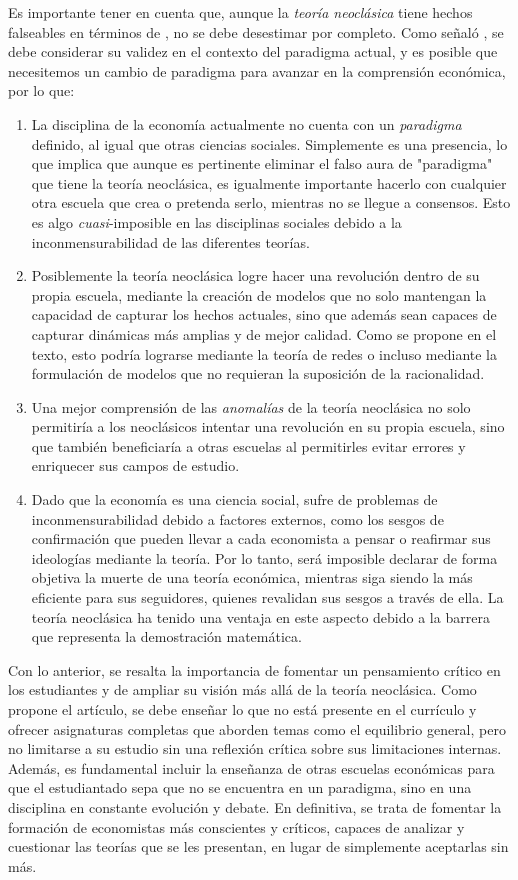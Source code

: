 \documentclass[12pt]{article}
\begin{document}
\begin{flushleft}
    Es importante tener en cuenta que, aunque la \textit{teoría neoclásica} tiene hechos falseables en términos de \citet{popper_1959}, no se debe desestimar por completo. Como señaló \citet{kuhn_1971}, se debe considerar su validez en el contexto del paradigma actual, y es posible que necesitemos un cambio de paradigma para avanzar en la comprensión económica, por lo que:
    \begin{enumerate}
        \item La disciplina de la economía actualmente no cuenta con un \textit{paradigma} definido, al igual que otras ciencias sociales. Simplemente es una presencia, lo que implica que aunque es pertinente eliminar el falso aura de "paradigma" que tiene la teoría neoclásica, es igualmente importante hacerlo con cualquier otra escuela que crea o pretenda serlo, mientras no se llegue a consensos. Esto es algo \textit{cuasi}-imposible en las disciplinas sociales debido a la inconmensurabilidad de las diferentes teorías.
        \item Posiblemente la teoría neoclásica logre hacer una revolución dentro de su propia escuela, mediante la creación de modelos que no solo mantengan la capacidad de capturar los hechos actuales, sino que además sean capaces de capturar dinámicas más amplias y de mejor calidad. Como se propone en el texto, esto podría lograrse mediante la teoría de redes o incluso mediante la formulación de modelos que no requieran la suposición de la racionalidad.
        \item Una mejor comprensión de las \textit{anomalías} de la teoría neoclásica no solo permitiría a los neoclásicos intentar una revolución en su propia escuela, sino que también beneficiaría a otras escuelas al permitirles evitar errores y enriquecer sus campos de estudio.
        \item Dado que la economía es una ciencia social, sufre de problemas de inconmensurabilidad debido a factores externos, como los sesgos de confirmación que pueden llevar a cada economista a pensar o reafirmar sus ideologías mediante la teoría. Por lo tanto, será imposible declarar de forma objetiva la muerte de una teoría económica, mientras siga siendo la más eficiente para sus seguidores, quienes revalidan sus sesgos a través de ella. La teoría neoclásica ha tenido una ventaja en este aspecto debido a la barrera que representa la demostración matemática.
    \end{enumerate}
    Con lo anterior, se resalta la importancia de fomentar un pensamiento crítico en los estudiantes y de ampliar su visión más allá de la teoría neoclásica. Como propone el artículo, se debe enseñar lo que no está presente en el currículo y ofrecer asignaturas completas que aborden temas como el equilibrio general, pero no limitarse a su estudio sin una reflexión crítica sobre sus limitaciones internas. Además, es fundamental incluir la enseñanza de otras escuelas económicas para que el estudiantado sepa que no se encuentra en un paradigma, sino en una disciplina en constante evolución y debate. En definitiva, se trata de fomentar la formación de economistas más conscientes y críticos, capaces de analizar y cuestionar las teorías que se les presentan, en lugar de simplemente aceptarlas sin más.

\end{flushleft}
\end{document}
